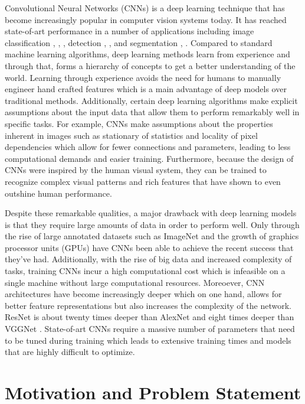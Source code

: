 \documentclass[12pt]{report}
\begin{document}
Convolutional Neural Networks (CNNs) \cite{LeCun2} is a deep learning technique that has become increasingly popular in computer vision systems today. It has reached state-of-art performance in a number of applications including image classification \cite{imgClassification1}, \cite{imgClassification2}, \cite{imgClassification3}, detection \cite{objDetection1}, \cite{objDetection2}, \cite{objDetection3} and segmentation \cite{segmentation1}, \cite{segmentation2}. Compared to standard machine learning algorithms, deep learning methods learn from experience and through that, forms a hierarchy of concepts to get a better understanding of the world. Learning through experience avoids the need for humans to manually engineer hand crafted features which is a main advantage of deep models over traditional methods.  Additionally, certain deep learning algorithms make explicit assumptions about the input data that allow them to perform remarkably well in specific tasks. For example, CNNs make assumptions about the properties inherent in images such as stationary of statistics and locality of pixel dependencies which allow for fewer connections and parameters, leading to less computational demands and easier training. Furthermore, because the design of CNNs were inspired by the human visual system, they can be trained to recognize complex visual patterns and rich features that have shown to even outshine human performance. 

Despite these remarkable qualities, a major drawback with deep learning models is that they require large amounts of data in order to perform well. Only through the rise of large annotated datasets such as ImageNet \cite{imgClassification3} and the growth of graphics processor units (GPUs) have CNNs been able to achieve the recent success that they've had. Additionally, with the rise of big data and increased complexity of tasks, training CNNs incur a high computational cost which is infeasible on a single machine without large computational resources. Moreoever, CNN architectures have become increasingly deeper which on one hand, allows for better feature representations but also increases the complexity of the network. ResNet \cite{ResNet} is about twenty times deeper than AlexNet \cite{imgClassification3} and eight times deeper than VGGNet \cite{VggNet}. State-of-art CNNs require a massive number of parameters that need to be tuned during training which leads to extensive training times and models that are highly difficult to optimize.

\section{Motivation and Problem Statement}
\end{document}
